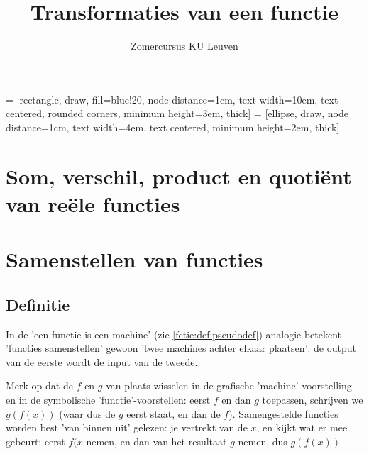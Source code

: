 \documentclass{ximera}
\author{Zomercursus KU Leuven}
\title{Transformaties van een functie}
\begin{document}
\begin{abstract}

\end{abstract}
\maketitle  

 = [rectangle, draw, fill=blue!20, node distance=1cm, text width=10em, text centered, rounded corners, minimum height=3em, thick]
 = [ellipse, draw, node distance=1cm, text width=4em, text centered, minimum height=2em, thick]

\section{Som, verschil, product en quotiënt van reële functies}


\section{Samenstellen van functies}

\subsection{Definitie}
In de 'een functie is een machine' (zie \autoref{fctie:def:pseudodef}) analogie betekent 'functies samenstellen' gewoon 'twee machines achter elkaar plaatsen': de output van de eerste wordt de input van de tweede. 

\begin{center}
\end{center}

Merk op dat de $f$ en $g$ van plaats wisselen in de grafische 'machine'-voorstelling en in de symbolische 'functie'-voorstellen: eerst $f$ en dan $g$ toepassen, schrijven we $g(f(x))$ (waar dus de $g$ eerst staat, en dan de $f$). Samengestelde functies worden best 'van binnen uit' gelezen: je vertrekt van de $x$, en kijkt wat er mee gebeurt: eerst $f(x$ nemen, en dan van het resultaat $g$ nemen, dus $g(f(x))$ 
\end{document}
